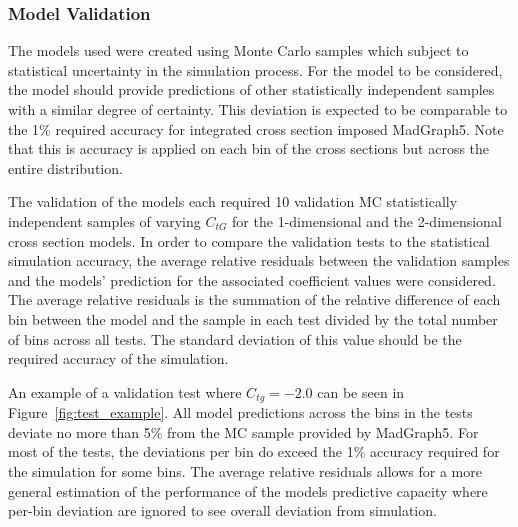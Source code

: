 \documentclass[a4paper,11pt]{article}
\begin{document}
\subsubsection{Model Validation}

The models used were created using Monte Carlo samples which subject to statistical uncertainty in the simulation process.
For the model to be considered, the model should provide predictions of other statistically independent samples with a similar degree of certainty.
This deviation is expected to be comparable to the 1\% required accuracy for integrated cross section imposed MadGraph5.
Note that this is accuracy is applied on each bin of the cross sections but across the entire distribution.

The validation of the models each required 10 validation MC statistically independent samples of varying $C_{tG}$ for the 1-dimensional and the 2-dimensional cross section models.
In order to compare the validation tests to the statistical simulation accuracy, the average relative residuals between the validation samples and the models' prediction for the associated coefficient values were considered.
The average relative residuals is the summation of the relative difference of each bin between the model and the sample in each test divided by the total number of bins across all tests.
The standard deviation of this value should be the required accuracy of the simulation.

An example of a validation test where $C_{tg}=-2.0$ can be seen in Figure~\ref{fig:test_example}.
All model predictions across the bins in the tests deviate no more than 5\% from the MC sample provided by MadGraph5.
For most of the tests, the deviations per bin do exceed the 1\% accuracy required for the simulation for some bins.
The average relative residuals allows for a more general estimation of the performance of the models predictive capacity where per-bin deviation are ignored to see overall deviation from simulation.
\end{document}
